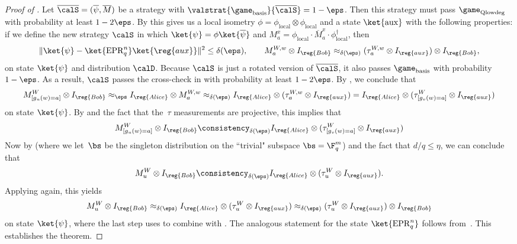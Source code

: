 \begin{proof}[Proof of ]
Let $\overline{\calS} = (\overline{\psi}, \overline{M})$ be a strategy with $\valstrat{\game_{\mathrm{basis}}}{\overline{\calS}} = 1-\eps$.
Then this strategy must pass $\game_{\mathrm{Qlowdeg}}$ with probability at least $1-2\eps$.
By  this gives us a local isometry
$\phi = \phi_{\mathrm{local}}\otimes \phi_{\mathrm{local}}$ and a state $\ket{\mathrm{aux}}$
with the following properties:
if we define the new strategy $\calS$
in which $\ket{\psi} = \phi \ket{\overline{\psi}}$
and $M_a^x = \phi_{\mathrm{local}}\cdot \overline{M}_a^x \cdot \phi_{\mathrm{local}}^\dagger$, then
\begin{equation}\label{eq:cant-think-of-a-good-name}
\Vert \ket{\psi} - \ket{\mathrm{EPR}_q^n} \ket{\reg{aux}} \Vert^2 \leq \delta(\eps),
\qquad
M_a^{W,w} \otimes I_{\reg{Bob}}
\approx_{\delta(\eps)}
(\tau_a^{W,w} \otimes I_{\reg{aux}}) \otimes I_{\reg{Bob}},
\end{equation}
on state $\ket{\psi}$ and distribution $\calD$.
Because $\calS$ is just a rotated version of $\overline{\calS}$,
it also passes $\game_{\mathrm{basis}}$ with probability $1-\eps$.
As a result, $\calS$ passes the cross-check in  with probability at least $1-2\eps$.
By , we conclude that
\begin{equation}\label{eq:worth-studying}
M^W_{[g_u(w)=a]} \otimes I_{\reg{Bob}}
\approx_{\eps}
I_{\reg{Alice}} \otimes M^{W,w}_a
\approx_{\delta(\eps)} I_{\reg{Alice}} \otimes (\tau^{W,w}_a \otimes I_{\reg{aux}})
= I_{\reg{Alice}} \otimes (\tau^{W}_{[g_v(w)=a]} \otimes I_{\reg{aux}})
\end{equation}
on state $\ket{\psi}$.
By  and the fact that the~$\tau$ measurements are projective, this implies that
\begin{equation*}
M^W_{[g_u(w)=a]} \otimes I_{\reg{Bob}}
\consistency_{\delta(\eps)} I_{\reg{Alice}} \otimes (\tau^{W}_{[g_v(w)=a]} \otimes I_{\reg{aux}})
\end{equation*}
Now by
 (where we let~$\bs$ be the singleton distribution on the ``trivial" subspace $\bs = \F_q^m$)
and the fact that $d/q \leq \eta$, we can conclude that
\begin{equation*}
M^W_{u} \otimes I_{\reg{Bob}}
\consistency_{\delta(\eps)} I_{\reg{Alice}} \otimes (\tau^{W}_{u} \otimes I_{\reg{aux}}).
\end{equation*}
Applying  again, this yields
\begin{equation}\label{eq:almost-there-almost-there}
M_{u}^{W} \otimes I_{\reg{Bob}}
\approx_{\delta(\eps)} I_{\reg{Alice}} \otimes (\tau_{u}^{W} \otimes I_{\reg{aux}})
\approx_{\delta(\eps)} (\tau_{u}^W \otimes I_{\reg{aux}}) \otimes I_{\reg{Bob}}
\end{equation}
on state $\ket{\psi}$, where the last step uses 
to combine  with .
The analogous statement for the state $\ket{\mathrm{EPR}_q^n}$ follows from~.
This establishes the theorem.
\end{proof}

  


